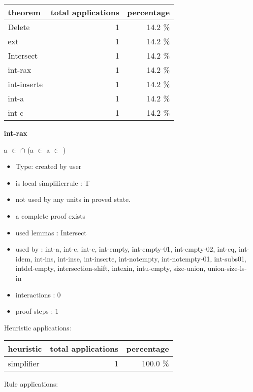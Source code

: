 \documentclass[a4paper]{article}
\begin{document}
\begin{supertabular}{l|r|r}
theorem	        & total applications & percentage \\ \hline
Delete & 1 & 14.2 \% \\
ext & 1 & 14.2 \% \\
Intersect & 1 & 14.2 \% \\
int-rax & 1 & 14.2 \% \\
int-inserte & 1 & 14.2 \% \\
int-a & 1 & 14.2 \% \\
int-c & 1 & 14.2 \% \\

\end{supertabular}
\pagebreak

{\LARGE\bf int-rax}\label{lemma-int-rax}

\medskip

 \Fol a $\in$  $\cap$  \Equiv \Not \Not (a $\in$  \And a $\in$ )

\begin{itemize}

\item Type: created by user

\item is local simplifierrule : T
\item not used by any units in proved state.
\item       a complete proof exists
\item       used lemmas  : Intersect
\item       used by      : int-a, int-c, int-e, int-empty, int-empty-01, int-empty-02, int-eq, int-idem, int-ins, int-inse, int-inserte, int-notempty, int-notempty-01, int-subs01, intdel-empty, intersection-shift, intexin, intu-empty, size-union, union-size-ls-in
\item       interactions : 0
\item       proof steps  : 1
\end{itemize}

\medskip


Heuristic applications:

\begin{supertabular}{l|r|r}
heuristic	& total applications & percentage \\ \hline
simplifier & 1 & 100.0 \% \\

\end{supertabular}

Rule applications:
\end{document}
